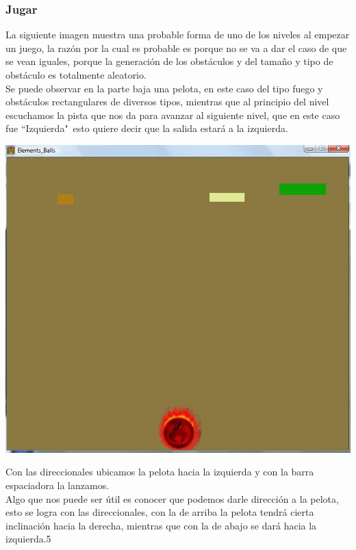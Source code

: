\documentclass[10pt]{article}
\begin{document}
{\begin{flushleft}
\subsubsection{Jugar}
La siguiente imagen muestra una probable forma de uno de los niveles al empezar un juego, la raz\'on por la cual es probable es porque no se va a dar el caso de que se vean iguales, porque la generaci\'on de los obst\'aculos y del tama\~no y tipo de obst\'aculo es totalmente aleatorio.\\
Se puede observar en la parte baja una pelota, en este caso del tipo fuego y obst\'aculos rectangulares de diversos tipos, mientras que al principio del nivel escuchamos la pista que nos da para avanzar al siguiente nivel, que en este caso fue ``Izquierda"\ esto quiere decir que la salida estar\'a a la izquierda.
\begin{center}
\includegraphics[scale=0.6]{jugar1}
\end{center}
\vspace{0.2in}Con las direccionales ubicamos la pelota hacia la izquierda y con la barra espaciadora la lanzamos.\\
Algo que nos puede ser \'util es conocer que podemos darle direcci\'on a la pelota, esto se logra con las direccionales, con la de arriba la pelota tendr\'a cierta inclinaci\'on hacia la derecha, mientras que con la de abajo se dar\'a hacia la izquierda.5


\end{flushleft}}
\end{document}
